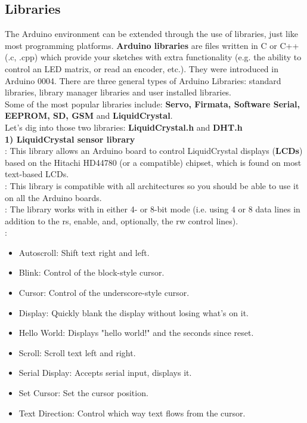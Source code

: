 \documentclass[a4paper]{article}
\begin{document}
\subsection{Libraries}
The Arduino environment can be extended through the use of libraries, just like most programming platforms. \textbf{Arduino libraries} are files written in C or C++ (.c, .cpp) which provide your sketches with extra functionality (e.g. the ability to control an LED matrix, or read an encoder, etc.). They were introduced in Arduino 0004. There are three general types of Arduino Libraries: standard libraries, library manager libraries and user installed libraries.\bigskip\\
Some of the most popular libraries include: \textbf{Servo, Firmata, Software Serial, EEPROM, SD, GSM} and \textbf{LiquidCrystal}.\bigskip\\
Let's dig into those two libraries: \textbf{LiquidCrystal.h} and \textbf{DHT.h}\bigskip\\
\textbf{1) LiquidCrystal sensor library}\\
\text{[Description]}: This library allows an Arduino board to control LiquidCrystal displays (\textbf{LCDs}) based on the Hitachi HD44780 (or a compatible) chipset, which is found on most text-based LCDs.\\
\text{[Compatibility]}: This library is compatible with all architectures so you should be able to use it on all the Arduino boards.\\
\text{[NOTE]}: The library works with in either 4- or 8-bit mode (i.e. using 4 or 8 data lines in addition to the rs, enable, and, optionally, the rw control lines).\\
\text{[EXAMPLES]}:
\begin{itemize}
    \item Autoscroll: Shift text right and left.
    \item Blink: Control of the block-style cursor.
    \item Cursor: Control of the underscore-style cursor.
    \item Display: Quickly blank the display without losing what's on it.
    \item Hello World: Displays "hello world!" and the seconds since reset.
    \item Scroll: Scroll text left and right.
    \item Serial Display: Accepts serial input, displays it.
    \item Set Cursor: Set the cursor position.
    \item Text Direction: Control which way text flows from the cursor.
\end{itemize}\bigskip
\end{document}
